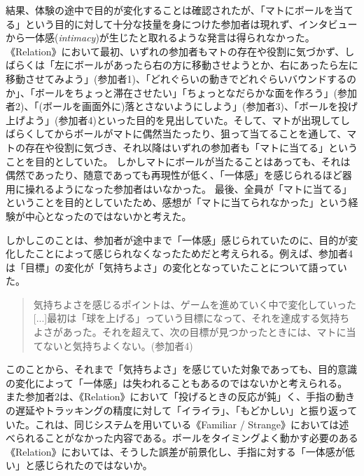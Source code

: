 結果、体験の途中で目的が変化することは確認されたが、「マトにボールを当てる」という目的に対して十分な技量を身につけた参加者は現れず、インタビューから一体感(\textit{intimacy})が生じたと取れるような発言は得られなかった。
《Relation》において最初、いずれの参加者もマトの存在や役割に気づかず、しばらくは「左にボールがあったら右の方に移動させようとか、右にあったら左に移動させてみよう」(参加者1)、「どれぐらいの動きでどれぐらいバウンドするのか」、「ボールをちょっと滞在させたい」「ちょっとなだらかな面を作ろう」(参加者2)、「(ボールを画面外に)落とさないようにしよう」(参加者3)、「ボールを投げ上げよう」(参加者4)といった目的を見出していた。そして、マトが出現してしばらくしてからボールがマトに偶然当たったり、狙って当てることを通して、マトの存在や役割に気づき、それ以降はいずれの参加者も「マトに当てる」ということを目的としていた。
しかしマトにボールが当たることはあっても、それは偶然であったり、随意であっても再現性が低く、「一体感」を感じられるほど器用に操れるようになった参加者はいなかった。
最後、全員が「マトに当てる」ということを目的としていたため、感想が「マトに当てられなかった」という経験が中心となったのではないかと考えた。

しかしこのことは、参加者が途中まで「一体感」感じられていたのに、目的が変化したことによって感じられなくなったためだと考えられる。例えば、参加者4は「目標」の変化が「気持ちよさ」の変化となっていたことについて語っていた。
\begin{quote}
  気持ちよさを感じるポイントは、ゲームを進めていく中で変化していった[...]最初は「球を上げる」っていう目標になって、それを達成する気持ちよさがあった。それを超えて、次の目標が見つかったときには、マトに当てないと気持ちよくない。(参加者4)
\end{quote}
このことから、それまで「気持ちよさ」を感じていた対象であっても、目的意識の変化によって「一体感」は失われることもあるのではないかと考えられる。
また参加者2は、《Relation》において「投げるときの反応が鈍」く、手指の動きの遅延やトラッキングの精度に対して「イライラ」、「もどかしい」と振り返っていた。これは、同じシステムを用いている《Familiar / Strange》においては述べられることがなかった内容である。ボールをタイミングよく動かす必要のある《Relation》においては、そうした誤差が前景化し、手指に対する「一体感が低い」と感じられたのではないか。


